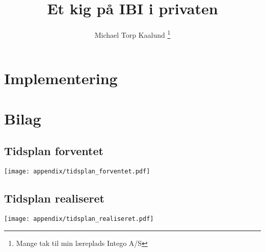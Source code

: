 \documentclass[12pt,a4paper,twoside]{article}
\title{Et kig på IBI i privaten}
\author{Michael Torp Kaalund \thanks{Mange tak til min læreplads Intego A/S}}
\begin{document}
  
    





    \tableofcontents

    

    \section{Implementering}
        
        
        

  

    \appendix
    \section{Bilag}
       
    \subsection{Tidsplan forventet} \label{sec:tidsplan_forventet}
    \texttt{[image: appendix/tidsplan\_forventet.pdf]}
    \subsection{Tidsplan realiseret} \label{sec:tidsplan_realiseret}
    \texttt{[image: appendix/tidsplan\_realiseret.pdf]}
\end{document}
